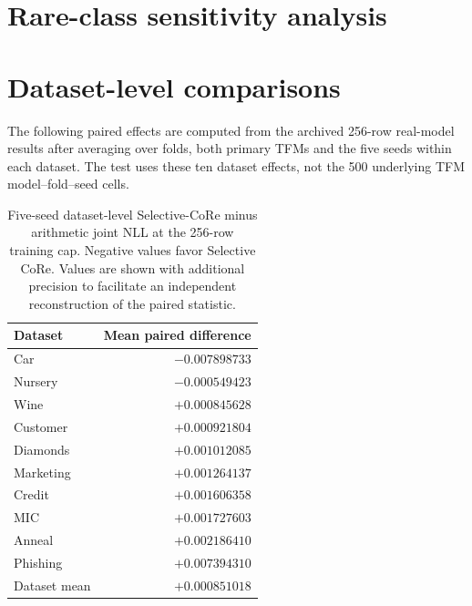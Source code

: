 \documentclass[a4paper,fleqn]{cas-sc}
\begin{document}
\appendix
\section{Rare-class sensitivity analysis}
\begin{table}
\centering
\caption{Rare-class exclusion sensitivity at the 256-row cap. Positive effects mean Selective CoRe is worse than arithmetic pooling.}
\end{table}

\section{Dataset-level comparisons}
The following paired effects are computed from the archived 256-row real-model results after averaging over folds, both primary TFMs and the five seeds within each dataset. The test uses these ten dataset effects, not the 500 underlying TFM model--fold--seed cells.
\begin{table}
\centering
\caption{Five-seed dataset-level Selective-CoRe minus arithmetic joint NLL at the 256-row training cap. Negative values favor Selective CoRe. Values are shown with additional precision to facilitate an independent reconstruction of the paired statistic.}
\label{tab:datasetprimary}
\begin{tabular}{lr}
\toprule
Dataset & Mean paired difference\\
\midrule
Car & $-0.007898733$\\
Nursery & $-0.000549423$\\
Wine & $+0.000845628$\\
Customer & $+0.000921804$\\
Diamonds & $+0.001012085$\\
Marketing & $+0.001264137$\\
Credit & $+0.001606358$\\
MIC & $+0.001727603$\\
Anneal & $+0.002186410$\\
Phishing & $+0.007394310$\\
\midrule
Dataset mean & $+0.000851018$\\
\bottomrule
\end{tabular}
\end{table}
\end{document}
